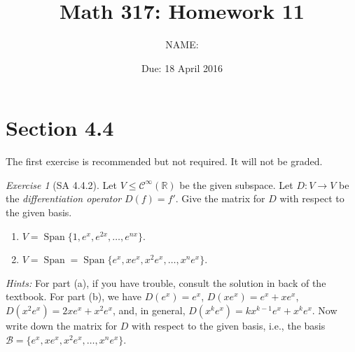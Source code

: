 \documentclass[fleqn,11pt]{paper}
\author {NAME:                     }
\title{Math 317: Homework 11}
\date{Due: 18 April 2016}
\theoremstyle{remark}
\newtheorem*{solution}{{\bf Solution}}
\newtheorem*{ex}{Exercise}
\newcommand\R{\fld{R}}
\newcommand{\<}{\ensuremath{\langle}}
\renewcommand{\>}{\ensuremath{\rangle}}
\newcommand\fld[1]{\ensuremath{\mathbb{#1}}}
\newcommand\sC{\ensuremath{\mathcal C}}
\newcommand\sB{\ensuremath{\mathcal B}}
\newcommand\Span{\ensuremath{\operatorname{Span}}}
\begin{document}
\maketitle

\section*{Section 4.4}
\noindent The first exercise is recommended but not required.  It will not be graded.
\begin{ex}[SA 4.4.2]
  Let $V \leq \sC^\infty(\R)$ be the given subspace.
Let $D : V \to V$ be the \emph{differentiation operator}
$D(f) = f'$. Give the matrix for $D$ with respect to the given basis.
\begin{enumerate}[{\bf a.}]
  \item $V = \Span \{1, e^x, e^{2x}, \dots, e^{nx}\}$.
  \item $V = \Span= \Span\{e^x, xe^x, x^2 e^x, \dots, x^n e^x\}$. 
\end{enumerate}
{\it Hints:} For part (a), if you have trouble, consult the solution in back of
  the textbook. For part (b), 
we have $D(e^x) = e^x$, $D(xe^x) = e^x + xe^x$, $D(x^2e^x) = 2xe^x + x^2 e^x$, 
and, in general, $D(x^k e^x) = kx^{k-1} e^x + x^k e^x$.  Now write down the
matrix for $D$ with respect to the given basis, i.e., the basis
$\sB = \{e^x, xe^x, x^2 e^x, \dots, x^n e^x\}$. 
\end{ex}

\newpage
\end{document}
